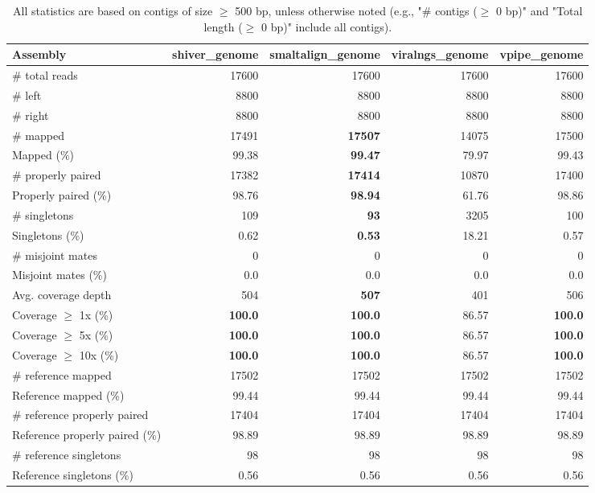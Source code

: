 \documentclass[12pt,a4paper]{article}
\begin{document}
\begin{table}[ht]
\begin{center}
\caption{All statistics are based on contigs of size $\geq$ 500 bp, unless otherwise noted (e.g., "\# contigs ($\geq$ 0 bp)" and "Total length ($\geq$ 0 bp)" include all contigs).}
\begin{tabular}{|l*{4}{|r}|}
\hline
Assembly & shiver\_genome & smaltalign\_genome & viralngs\_genome & vpipe\_genome \\ \hline
\# total reads & 17600 & 17600 & 17600 & 17600 \\ \hline
\# left & 8800 & 8800 & 8800 & 8800 \\ \hline
\# right & 8800 & 8800 & 8800 & 8800 \\ \hline
\# mapped & 17491 & {\bf 17507} & 14075 & 17500 \\ \hline
Mapped (\%) & 99.38 & {\bf 99.47} & 79.97 & 99.43 \\ \hline
\# properly paired & 17382 & {\bf 17414} & 10870 & 17400 \\ \hline
Properly paired (\%) & 98.76 & {\bf 98.94} & 61.76 & 98.86 \\ \hline
\# singletons & 109 & {\bf 93} & 3205 & 100 \\ \hline
Singletons (\%) & 0.62 & {\bf 0.53} & 18.21 & 0.57 \\ \hline
\# misjoint mates & 0 & 0 & 0 & 0 \\ \hline
Misjoint mates (\%) & 0.0 & 0.0 & 0.0 & 0.0 \\ \hline
Avg. coverage depth & 504 & {\bf 507} & 401 & 506 \\ \hline
Coverage $\geq$ 1x (\%) & {\bf 100.0} & {\bf 100.0} & 86.57 & {\bf 100.0} \\ \hline
Coverage $\geq$ 5x (\%) & {\bf 100.0} & {\bf 100.0} & 86.57 & {\bf 100.0} \\ \hline
Coverage $\geq$ 10x (\%) & {\bf 100.0} & {\bf 100.0} & 86.57 & {\bf 100.0} \\ \hline
\# reference mapped & 17502 & 17502 & 17502 & 17502 \\ \hline
Reference mapped (\%) & 99.44 & 99.44 & 99.44 & 99.44 \\ \hline
\# reference properly paired & 17404 & 17404 & 17404 & 17404 \\ \hline
Reference properly paired (\%) & 98.89 & 98.89 & 98.89 & 98.89 \\ \hline
\# reference singletons & 98 & 98 & 98 & 98 \\ \hline
Reference singletons (\%) & 0.56 & 0.56 & 0.56 & 0.56 \\ \hline

\end{tabular}
\end{center}
\end{table}
\end{document}
